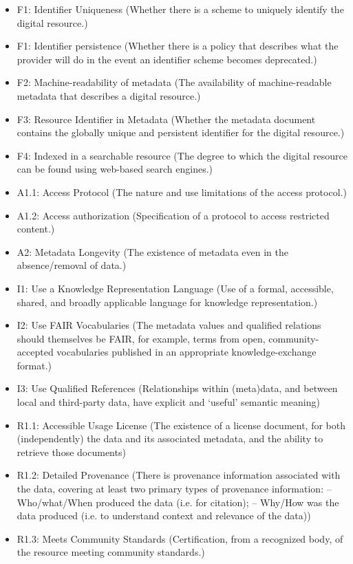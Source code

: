 \begin{itemize}
 \setlength{\parskip}{0pt}
 \setlength{\itemsep}{0pt plus 1pt}
 \item F1: Identifier Uniqueness (Whether there is a scheme to uniquely identify the digital resource.)
 \item F1: Identifier persistence (Whether there is a policy that describes what the provider will do in the event an identifier scheme becomes deprecated.)
 \item F2: Machine-readability of metadata (The availability of machine-readable metadata that describes a digital resource.)
 \item F3: Resource Identifier in Metadata (Whether the metadata document contains the globally unique and persistent identifier for the digital resource.)
 \item F4: Indexed in a searchable resource (The degree to which the digital resource can be found using web-based search engines.)
 \item A1.1: Access Protocol (The nature and use limitations of the access protocol.)
 \item A1.2: Access authorization (Specification of a protocol to access restricted content.)
 \item A2: Metadata Longevity (The existence of metadata even in the absence/removal of data.)
 \item I1: Use a Knowledge Representation Language (Use of a formal, accessible, shared, and broadly applicable language for knowledge representation.)
 \item I2: Use FAIR Vocabularies (The metadata values and qualified relations should themselves be FAIR, for example, terms from open, community-accepted vocabularies published in an appropriate knowledge-exchange format.)
 \item I3: Use Qualified References (Relationships within (meta)data, and between local and third-party data, have explicit and `useful' semantic meaning)
 \item R1.1: Accessible Usage License (The existence of a license document, for both (independently) the data and its associated metadata, and the ability to retrieve those documents)
 \item R1.2: Detailed Provenance (There is provenance information associated with the data, covering at least two primary types of provenance information: -- Who/what/When produced the data (i.e. for citation); -- Why/How was the data produced (i.e. to understand context and relevance of the data))
 \item R1.3: Meets Community Standards (Certification, from a recognized body, of the resource meeting community standards.)
\end{itemize}

